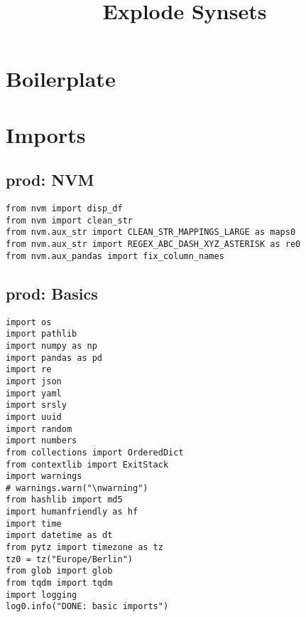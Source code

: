 \documentclass[a4paper,10pt,onecolumn,oneside,openright]{article}
\date{}
\title{Explode Synsets}
\begin{document}
\maketitle

\section{Boilerplate}
\label{sec:orgeeb0547}
\section{Imports}
\label{sec:org28c2ace}
\subsection{prod: NVM}
\label{sec:org782959f}
\begin{verbatim}
from nvm import disp_df
from nvm import clean_str
from nvm.aux_str import CLEAN_STR_MAPPINGS_LARGE as maps0
from nvm.aux_str import REGEX_ABC_DASH_XYZ_ASTERISK as re0
from nvm.aux_pandas import fix_column_names
\end{verbatim}

\subsection{prod: Basics}
\label{sec:org8869032}
\begin{verbatim}
import os
import pathlib
import numpy as np
import pandas as pd
import re
import json
import yaml
import srsly
import uuid
import random
import numbers
from collections import OrderedDict
from contextlib import ExitStack
import warnings
# warnings.warn("\nwarning")
from hashlib import md5
import humanfriendly as hf
import time
import datetime as dt
from pytz import timezone as tz
tz0 = tz("Europe/Berlin")
from glob import glob
from tqdm import tqdm
import logging
log0.info("DONE: basic imports")
\end{verbatim}
\end{document}
